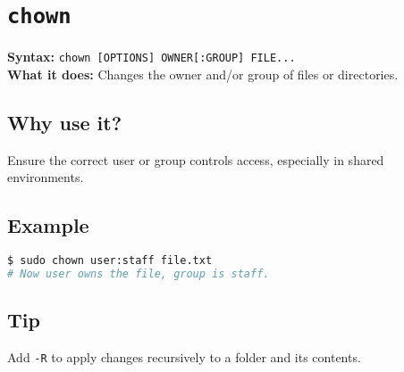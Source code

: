 \documentclass[10pt,oneside]{scrbook}
\begin{document}
\section{\texttt{chown}}
\begin{cmdbox}
  \textbf{Syntax:} \lstinline!chown [OPTIONS] OWNER[:GROUP] FILE...! \\
  \textbf{What it does:} Changes the owner and/or group of files or directories.
\end{cmdbox}
\begin{commanddetails}
  \subsection*{Why use it?}
    Ensure the correct user or group controls access, especially in shared environments.

  \subsection*{Example}
  \begin{lstlisting}[language=bash]
$ sudo chown user:staff file.txt
# Now user owns the file, group is staff.
  \end{lstlisting}

  \subsection*{Tip}
    Add \lstinline!-R! to apply changes recursively to a folder and its contents.
\end{commanddetails}

\end{document}
